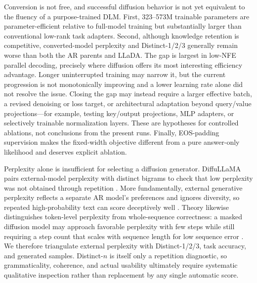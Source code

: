 \documentclass{article}
\begin{document}
Conversion is not free, and successful diffusion behavior is not yet equivalent to the fluency of a purpose-trained DLM. First, 323--573M trainable parameters are parameter-efficient relative to full-model training but substantially larger than conventional low-rank task adapters. Second, although knowledge retention is competitive, converted-model perplexity and Distinct-1/2/3 generally remain worse than both the AR parents and LLaDA. The gap is largest in low-NFE parallel decoding, precisely where diffusion offers its most interesting efficiency advantage. Longer uninterrupted training may narrow it, but the current progression is not monotonically improving and a lower learning rate alone did not resolve the issue. Closing the gap may instead require a larger effective batch, a revised denoising or loss target, or architectural adaptation beyond query/value projections---for example, testing key/output projections, MLP adapters, or selectively trainable normalization layers. These are hypotheses for controlled ablations, not conclusions from the present runs. Finally, EOS-padding supervision makes the fixed-width objective different from a pure answer-only likelihood and deserves explicit ablation.

Perplexity alone is insufficient for selecting a diffusion generator. DiffuLLaMA pairs external-model perplexity with distinct bigrams to check that low perplexity was not obtained through repetition \citep{gong2025diffullama}. More fundamentally, external generative perplexity reflects a separate AR model's preferences and ignores diversity, so repeated high-probability text can score deceptively well \citep{turok2026duel}. Theory likewise distinguishes token-level perplexity from whole-sequence correctness: a masked diffusion model may approach favorable perplexity with few steps while still requiring a step count that scales with sequence length for low sequence error \citep{feng2025benefit}. We therefore triangulate external perplexity with Distinct-1/2/3, task accuracy, and generated samples. Distinct-$n$ is itself only a repetition diagnostic, so grammaticality, coherence, and actual usability ultimately require systematic qualitative inspection rather than replacement by any single automatic score.
\end{document}
